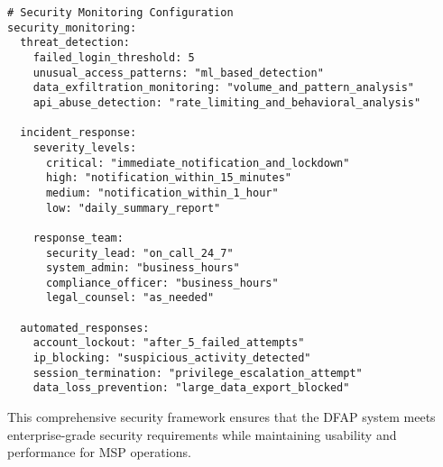 \begin{verbatim}
# Security Monitoring Configuration
security_monitoring:
  threat_detection:
    failed_login_threshold: 5
    unusual_access_patterns: "ml_based_detection"
    data_exfiltration_monitoring: "volume_and_pattern_analysis"
    api_abuse_detection: "rate_limiting_and_behavioral_analysis"
    
  incident_response:
    severity_levels:
      critical: "immediate_notification_and_lockdown"
      high: "notification_within_15_minutes"
      medium: "notification_within_1_hour"
      low: "daily_summary_report"
      
    response_team:
      security_lead: "on_call_24_7"
      system_admin: "business_hours"
      compliance_officer: "business_hours"
      legal_counsel: "as_needed"
      
  automated_responses:
    account_lockout: "after_5_failed_attempts"
    ip_blocking: "suspicious_activity_detected"
    session_termination: "privilege_escalation_attempt"
    data_loss_prevention: "large_data_export_blocked"
\end{verbatim}

This comprehensive security framework ensures that the DFAP system meets enterprise-grade security requirements while maintaining usability and performance for MSP operations. 